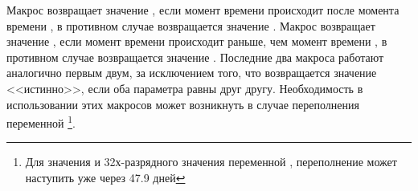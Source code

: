 Макрос  возвращает значение , если момент
времени  происходит после момента времени , в противном случае
возвращается значение . Макрос  возвращает 
значение , если момент времени  происходит раньше, чем момент
времени , в противном случае возвращается значение . Последние два
макроса работают аналогично первым двум, за исключением того, что возвращается
значение <<истинно>>, если оба параметра равны друг другу.
Необходимость в использовании этих макросов может возникнуть в случае переполнения
переменной \footnote{Для значения  и 32х-разрядного значения переменной ,
переполнение может наступить уже через 47.9 дней}.
\newpage
